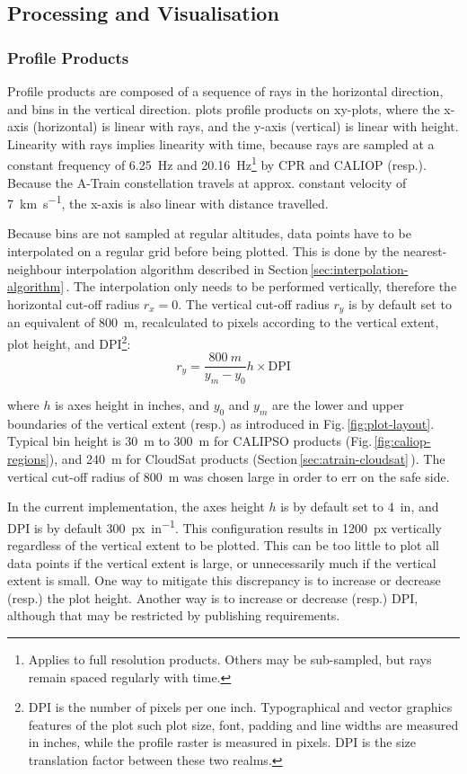 \subsection{Processing and Visualisation}
\subsubsection{Profile Products}
Profile products are composed of a sequence of rays in the horizontal direction,
and bins in the vertical direction. \ccplot plots profile products on xy-plots,
where the x-axis (horizontal) is linear with rays, and the y-axis (vertical) is
linear with height. Linearity with rays implies linearity with time, because
rays are sampled at a constant frequency of \SI{6.25}{Hz} and
\SI{20.16}{Hz}\footnote{Applies to full resolution products. Others may be
sub-sampled, but rays remain spaced regularly with time.} by CPR and CALIOP
(resp.). Because the A-Train constellation travels at approx. constant velocity
of \SI{7}{km s^{-1}}, the x-axis is also linear with distance travelled.

Because bins are not sampled at regular altitudes, data points have to be
interpolated on a regular grid before being plotted. This is done by the
nearest-neighbour interpolation algorithm described in
Section\,\ref{sec:interpolation-algorithm}\,.
The interpolation only needs to be performed vertically, therefore the
horizontal cut-off radius $r_x = 0$. The vertical cut-off radius $r_y$ is by
default set to an equivalent of \SI{800}{m}, recalculated to pixels according to
the vertical extent, plot height, and DPI\footnote{DPI is the number of pixels
per one inch. Typographical and vector
graphics features of the plot such plot size, font, padding and line widths are
measured in inches, while the profile raster is measured in pixels. DPI is the
size translation factor between these two realms.}:
$$
r_y = \frac{\SI{800}{m}}{y_m - y_0} h \times \mathrm{DPI}
$$

\noindent where $h$ is axes height in inches, and $y_0$ and $y_m$ are the lower and upper boundaries of the
vertical extent (resp.) as introduced in Fig.\,\ref{fig:plot-layout}. Typical bin height is
\SI{30}{m} to \SI{300}{m} for CALIPSO products (Fig.\,\ref{fig:caliop-regions}),
and \SI{240}{m} for CloudSat products (Section\,\ref{sec:atrain-cloudsat}\,). The vertical
cut-off radius of \SI{800}{m} was chosen large in order to err on the safe side.

In the current implementation, the axes height $h$ is by default set to
\SI{4}{in}, and DPI  is by default \SI{300}{px in^{-1}}. This
configuration results in \SI{1200}{px} vertically regardless of the vertical
extent to be plotted. This can be too little to plot all data points if the
vertical extent is large, or unnecessarily much if the vertical extent is small.
One way to mitigate this discrepancy is to increase or decrease (resp.) the plot
height. Another way is to increase or decrease (resp.) DPI, although that may
be restricted by publishing requirements.

